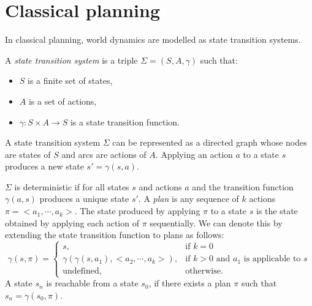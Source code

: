 \section{Classical planning}\label{subsec:Classical planning problem}
In classical planning, world dynamics are modelled as state transition systems.

\begin{definition}
A \textit{state transition system} is a triple $\Sigma = (S, A, \gamma)$ such that:
\begin{itemize}
\item $S$ is a finite set of states,
\item $A$ is a set of actions,
\item $\gamma : S \times A \rightarrow S$ is a state transition function.
\end{itemize}
\end{definition}

A state transition system $\Sigma$ can be represented as a directed graph whose nodes are states of $S$ and arcs are actions of $A$. 
Applying an action $a$ to a state $s$ produces a new state $s'= \gamma(s,a)$.
 
$\Sigma$ is deterministic if for all states $s$ and actions $a$ and the transition function $\gamma(a, s)$ produces a unique state $s'$. 
A \textit{plan} is any sequence of $k$ actions $\pi = <a_1,\cdots, a_k>$. The state produced by applying $\pi$ to a state $s$ is the state obtained by applying each action of $\pi$ sequentially. 
We can denote this by extending the state transition function to plans as follows:
\[\gamma(s,\pi)=\left\{
\begin{array}{ll}
   s, &\mbox{if $k=0$} \\
   \gamma(\gamma(s,a_1),<a_2,\cdots, a_k>), &\mbox{if $k>0$ and $a_1$ is applicable to $s$} \\
   \mbox{undefined}, &\mbox{otherwise.}
\end{array}
\right.
\]
A state $s_n$ is reachable from a state $s_0$, if there exists a plan $\pi$ such that $s_{n} = \gamma(s_0, \pi)$.


